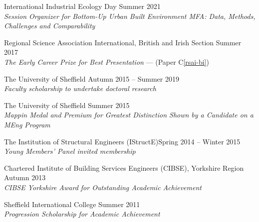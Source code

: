 \documentclass[10pt]{article}
\newcommand{\blankline}{\quad\pagebreak[3]}
\begin{document}
\blankline

International Industrial Ecology Day \hfill {Summer 2021}\\
\emph{Session Organizer for Bottom-Up Urban Built Environment MFA: Data, Methods, Challenges and Comparability}

\blankline


Regional Science Association International, British and Irish Section \hfill {Summer 2017}\\
\emph{The Early Career Prize for Best Presentation} --- (Paper C\ref{rsai-bi})

\blankline

The University of Sheffield \hfill {Autumn 2015 -- Summer 2019}\\
\emph{Faculty scholarship to undertake doctoral research}%

\blankline

The University of Sheffield \hfill {Summer 2015}\\
\emph{Mappin Medal and Premium for Greatest Distinction Shown by a Candidate on a MEng Program}%

\blankline

The Institution of Structural Engineers (IStructE)\hfill {Spring 2014 -- Winter 2015}\\
\emph{Young Members' Panel invited membership}

\blankline

Chartered Institute of Building Services Engineers (CIBSE), Yorkshire Region \hfill {Autumn 2013}\\
\emph{CIBSE Yorkshire Award for Outstanding Academic Achievement}

\blankline

Sheffield International College \hfill {Summer 2011}\\
\emph{Progression Scholarship for Academic Achievement}\par
\renewcommand{\labelenumi}{J\theenumi.} 
\end{document}
